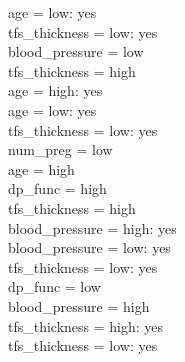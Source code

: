 \documentclass[12pt]{article}
\begin{document}
\textbar\quad \textbar\quad \textbar\quad \textbar\quad \textbar\quad \textbar\quad \textbar\quad age = low: yes\\
\textbar\quad \textbar\quad \textbar\quad \textbar\quad \textbar\quad \textbar\quad tfs\_thickness = low: yes\\
\textbar\quad \textbar\quad \textbar\quad \textbar\quad \textbar\quad blood\_pressure = low\\
\textbar\quad \textbar\quad \textbar\quad \textbar\quad \textbar\quad \textbar\quad tfs\_thickness = high\\
\textbar\quad \textbar\quad \textbar\quad \textbar\quad \textbar\quad \textbar\quad \textbar\quad age = high: yes\\
\textbar\quad \textbar\quad \textbar\quad \textbar\quad \textbar\quad \textbar\quad \textbar\quad age = low: yes\\
\textbar\quad \textbar\quad \textbar\quad \textbar\quad \textbar\quad \textbar\quad tfs\_thickness = low: yes\\
\textbar\quad \textbar\quad \textbar\quad num\_preg = low\\
\textbar\quad \textbar\quad \textbar\quad \textbar\quad age = high\\
\textbar\quad \textbar\quad \textbar\quad \textbar\quad \textbar\quad dp\_func = high\\
\textbar\quad \textbar\quad \textbar\quad \textbar\quad \textbar\quad \textbar\quad tfs\_thickness = high\\
\textbar\quad \textbar\quad \textbar\quad \textbar\quad \textbar\quad \textbar\quad \textbar\quad blood\_pressure = high: yes\\
\textbar\quad \textbar\quad \textbar\quad \textbar\quad \textbar\quad \textbar\quad \textbar\quad blood\_pressure = low: yes\\
\textbar\quad \textbar\quad \textbar\quad \textbar\quad \textbar\quad \textbar\quad tfs\_thickness = low: yes\\
\textbar\quad \textbar\quad \textbar\quad \textbar\quad \textbar\quad dp\_func = low\\
\textbar\quad \textbar\quad \textbar\quad \textbar\quad \textbar\quad \textbar\quad blood\_pressure = high\\
\textbar\quad \textbar\quad \textbar\quad \textbar\quad \textbar\quad \textbar\quad \textbar\quad tfs\_thickness = high: yes\\
\textbar\quad \textbar\quad \textbar\quad \textbar\quad \textbar\quad \textbar\quad \textbar\quad tfs\_thickness = low: yes\\
\end{document}
